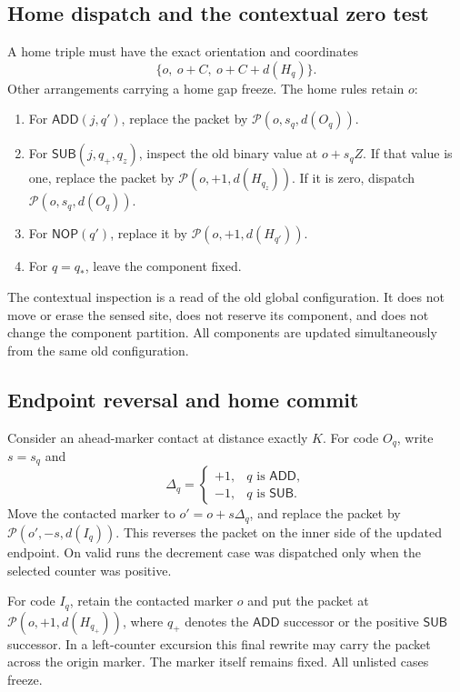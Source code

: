 \documentclass[11pt,a4paper]{article}
\numberwithin{equation}{section}
\newcommand{\ADD}{\mathsf{ADD}}\newcommand{\SUB}{\mathsf{SUB}}\newcommand{\NOP}{\mathsf{NOP}}\newcommand{\HALT}{\mathsf{HALT}}
\begin{document}
\subsection{Home dispatch and the contextual zero test}
A home triple must have the exact orientation and coordinates
\[
 \{o,\ o+C,\ o+C+d(H_q)\}.
\]
Other arrangements carrying a home gap freeze. The home rules retain $o$:
\begin{enumerate}
\item For $\ADD(j,q')$, replace the packet by
$\mathcal P(o,s_q,d(O_q))$.
\item For $\SUB(j,q_+,q_z)$, inspect the old binary value at $o+s_qZ$.
If that value is one, replace the packet by
$\mathcal P(o,+1,d(H_{q_z}))$. If it is zero, dispatch
$\mathcal P(o,s_q,d(O_q))$.
\item For $\NOP(q')$, replace it by $\mathcal P(o,+1,d(H_{q'}))$.
\item For $q=q_*$, leave the component fixed.
\end{enumerate}
The contextual inspection is a read of the old global configuration. It does
not move or erase the sensed site, does not reserve its component, and does
not change the component partition. All components are updated simultaneously
from the same old configuration.

\subsection{Endpoint reversal and home commit}
Consider an ahead-marker contact at distance exactly $K$.
For code $O_q$, write $s=s_q$ and
\[
 \Delta_q=\begin{cases}+1,&q\text{ is }\ADD,\\-1,&q\text{ is }\SUB.\end{cases}
\]
Move the contacted marker to $o'=o+s\Delta_q$, and replace the packet by
$\mathcal P(o',-s,d(I_q))$. This reverses the packet on the inner side of
the updated endpoint. On valid runs the decrement case was dispatched only
when the selected counter was positive.

For code $I_q$, retain the contacted marker $o$ and put the packet at
$\mathcal P(o,+1,d(H_{q_+}))$, where $q_+$ denotes the $\ADD$ successor or
the positive $\SUB$ successor. In a left-counter excursion this final rewrite
may carry the packet across the origin marker. The marker itself remains fixed.
All unlisted cases freeze.
\end{document}
